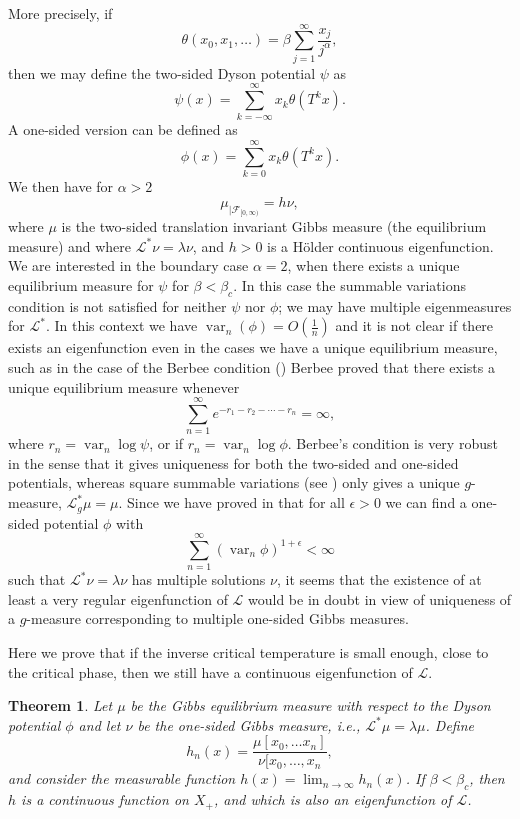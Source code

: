 \documentclass[11pt, a4paper, oneside]{scrartcl}
\newtheorem{thm}{Theorem}
\theoremstyle{definition}
\theoremstyle{remark}
\providecommand{\opn}{\operatorname}
\providecommand{\var}{\opn{var}}
\begin{document}
More precisely, if
$$\theta(x_0, x_1,\ldots)=\beta \sum_{j=1}^\infty \frac{x_j}{j^\alpha},$$
then we may define the two-sided Dyson potential $\psi$ as
$$\psi(x)=\sum_{k=-\infty}^\infty x_k \theta(T^k x).$$ 
A one-sided version can be defined as
$$\phi(x)=\sum_{k=0}^\infty x_k \theta (T^k x).$$
We then have for $\alpha>2$
$$\mu_{|{\mathcal F}_{[0,\infty)}}= h\nu,$$
where $\mu$ is the two-sided translation invariant Gibbs measure (the
equilibrium measure) and where ${\mathcal L}^*\nu=\lambda \nu$, and $h>0$ is a
H\"older continuous eigenfunction. We are interested in the boundary case
$\alpha=2$, when there exists a unique equilibrium measure for $\psi$ for
$\beta<\beta_c$. In this case the summable variations condition is not satisfied
for neither $\psi$ nor $\phi$; we may have multiple eigenmeasures for
${\mathcal L}^*$. In this context we have $\var_n(\phi)=O(\frac{1}{n})$ and it
is not clear if there exists an eigenfunction even in the cases we have a unique
equilibrium measure, such as in the case of the Berbee condition
(\cite{berbeeUniquenessGibbsMeasures1989}) Berbee proved that there exists a
unique equilibrium measure whenever
\begin{equation}\label{berbee}
  \sum_{n=1}^\infty e^{-r_1-r_2-\cdots-r_n}=\infty,    
\end{equation}
where $r_n=\var_n \log \psi$, or if $r_n=\var_n \log \phi$. Berbee's condition
is very robust in the sense that it gives uniqueness for both the two-sided and
one-sided potentials, whereas square summable variations (see
\cite{johanssonSquareSummabilityVariations2003}) only gives a unique
$g$-measure, ${\mathcal L}_g^* \mu=\mu$. Since we have proved in
\cite{johanssonPhaseTransitionsLongrange2017}
that for all $\epsilon>0$ we can find a one-sided potential $\phi$ with
$$\sum_{n=1}^\infty (\var_n \phi)^{1+\epsilon}<\infty$$
such that ${\mathcal L}^* \nu=\lambda \nu$ has multiple solutions $\nu$, it
seems that the existence of at least a very regular eigenfunction of
${\mathcal L}$ would be in doubt in view of uniqueness of a $g$-measure
corresponding to multiple one-sided Gibbs measures.

Here we prove that if the inverse critical temperature is small enough, close to
the critical phase, then we still have a continuous eigenfunction of ${\mathcal L}$.

\begin{thm}\label{main} Let $\mu$ be the Gibbs equilibrium measure with respect
to the Dyson potential $\phi$ and let $\nu$ be the one-sided Gibbs measure,
i.e., ${\mathcal L}^*\mu=\lambda \mu$. Define
$$h_n(x)=\frac{\mu[x_0,\ldots x_n]}{\nu[x_0,\ldots, x_n},$$
and consider the measurable function $h(x)=\lim_{n\to \infty}h_n(x)$. If
$\beta<\beta_c$, then $h$ is a continuous function on $X_+$, and which is also
an eigenfunction of ${\mathcal L}$.
\end{thm}
\end{document}
